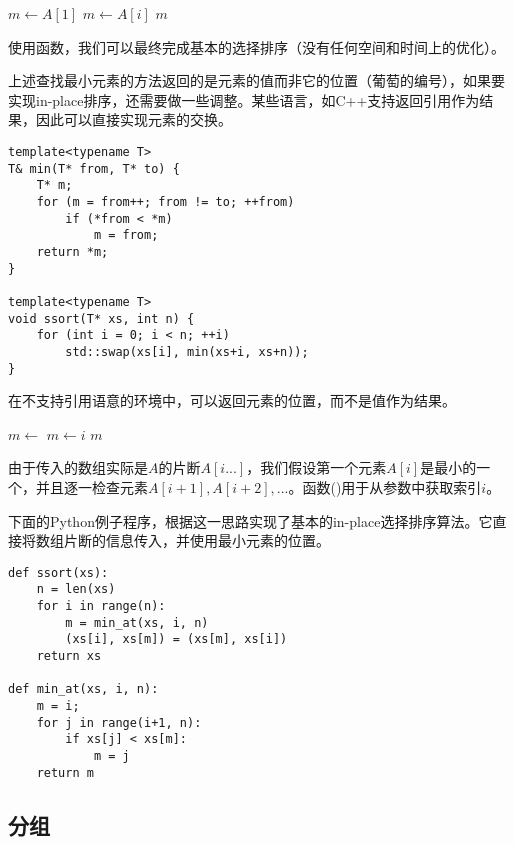 \documentclass[UTF8]{article}
\begin{document}
\begin{algorithmic}
  \State $m \gets A[1]$
      \State $m \gets A[i]$
    \EndIf
  \EndFor
  \State \Return $m$
\EndFunction
\end{algorithmic}

使用函数，我们可以最终完成基本的选择排序（没有任何空间和时间上的优化）。

上述查找最小元素的方法返回的是元素的值而非它的位置（葡萄的编号），如果要实现in-place排序，还需要做一些调整。某些语言，如C++支持返回引用作为结果，因此可以直接实现元素的交换。

\lstset{language=C++}
\begin{lstlisting}
template<typename T>
T& min(T* from, T* to) {
    T* m;
    for (m = from++; from != to; ++from)
        if (*from < *m)
            m = from;
    return *m;
}

template<typename T>
void ssort(T* xs, int n) {
    for (int i = 0; i < n; ++i)
        std::swap(xs[i], min(xs+i, xs+n));
}
\end{lstlisting}

在不支持引用语意的环境中，可以返回元素的位置，而不是值作为结果。

\begin{algorithmic}
  \State $m \gets$ 
      \State $m \gets i$
    \EndIf
  \EndFor
  \State \Return $m$
\EndFunction
\end{algorithmic}

由于传入的数组实际是$A$的片断$A[i...]$，我们假设第一个元素$A[i]$是最小的一个，并且逐一检查元素$A[i+1], A[i+2], ...$。函数()用于从参数中获取索引$i$。

下面的Python例子程序，根据这一思路实现了基本的in-place选择排序算法。它直接将数组片断的信息传入，并使用最小元素的位置。

\lstset{language=Python}
\begin{lstlisting}
def ssort(xs):
    n = len(xs)
    for i in range(n):
        m = min_at(xs, i, n)
        (xs[i], xs[m]) = (xs[m], xs[i])
    return xs

def min_at(xs, i, n):
    m = i;
    for j in range(i+1, n):
        if xs[j] < xs[m]:
            m = j
    return m
\end{lstlisting}

\subsection{分组}
\end{document}
